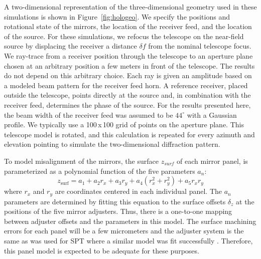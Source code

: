 A two-dimensional representation of the three-dimensional geometry used in these simulations is shown in Figure~\ref{fig:hologeo}.  We specify the positions and rotational state of the mirrors, the location of the receiver feed, and the location of the source.  For these simulations, we refocus the telescope on the near-field source by displacing the receiver a distance $\delta f$ from the nominal telescope focus. We ray-trace from a receiver position through the telescope to an aperture plane chosen at an arbitrary position a few meters in front of the telescope. The results do not depend on this arbitrary choice.  Each ray is given an amplitude based on a modeled beam pattern for the receiver feed horn.  A reference receiver, placed outside the telescope, points directly at the source and, in combination with the receiver feed, determines the phase of the source.  For the results presented here, the beam width of the receiver feed was assumed to be $44^\circ$ with a Gaussian profile.  We typically use a 100\,x\,100 grid of points on the aperture plane. This telescope model is rotated, and this calculation is repeated for every azimuth and elevation pointing to simulate the two-dimensional diffraction pattern.

To model misalignment of the mirrors, the surface $z_{surf}$ of each mirror panel, is parameterized as a polynomial function of the five parameters $a_n$:
\begin{equation}
     z_{\text{surf}} = a_1 + a_2 r_x+ a_3 r_y +a_4 (r_x^2 + r_y^2) + a_5 r_x r_y 
     \label{eq:zsurf}
\end{equation}
where $r_x$ and $r_y$ are coordinates centered in each individual panel.  The $a_n$ parameters are determined by fitting this equation to the surface offsets $\delta_z$ at the positions of the five mirror adjusters. Thus, there is a one-to-one mapping between adjuster offsets and the parameters in this model.  The surface machining errors for each panel will be a few micrometers and the adjuster system is the same as was used for SPT where a similar model was fit successfully \cite{Carlstrom_2011}.  Therefore, this panel model is expected to be adequate for these purposes.

